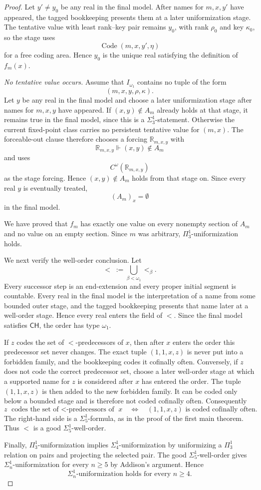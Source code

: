 \documentclass[10pt,a4paper]{amsart}
\newcommand{\CH}{\mathsf{CH}}
\newcommand{\forceR}{\mathbb{R}}
\begin{document}
\begin{proof}
Let $y'\neq y_0$ be any real in the final model. After names for $m,x,y'$ have appeared, the tagged bookkeeping presents them at a later uniformization stage. The tentative value with least rank--key pair remains $y_0$, with rank $\rho_0$ and key $\kappa_0$, so the stage uses
\[
\operatorname{Code}(m,x,y',\eta)
\]
for a free coding area. Hence $y_0$ is the unique real satisfying the definition of $f_m(x)$.

\medskip
\noindent
\emph{No tentative value occurs.}
Assume that $I_{\omega_1}$ contains no tuple of the form
\[
(m,x,y,\rho,\kappa).
\]
Let $y$ be any real in the final model and choose a later uniformization stage after names for $m,x,y$ have appeared. If $(x,y)\notin A_m$ already holds at that stage, it remains true in the final model, since this is a $\Sigma^1_3$-statement. Otherwise the current fixed-point class carries no persistent tentative value for $(m,x)$. The forceable-out clause therefore chooses a forcing $\forceR_{m,x,y}$ with
\[
\forceR_{m,x,y}\Vdash(x,y)\notin A_m
\]
and uses
\[
C^\omega(\forceR_{m,x,y})
\]
as the stage forcing. Hence $(x,y)\notin A_m$ holds from that stage on. Since every real $y$ is eventually treated,
\[
(A_m)_x=\emptyset
\]
in the final model.

We have proved that $f_m$ has exactly one value on every nonempty section of $A_m$ and no value on an empty section. Since $m$ was arbitrary, $\Pi^1_3$-uniformization holds.

We next verify the well-order conclusion. Let
\[
<\;:=\bigcup_{\beta<\omega_1}<_\beta.
\]
Every successor step is an end-extension and every proper initial segment is countable. Every real in the final model is the interpretation of a name from some bounded outer stage, and the tagged bookkeeping presents that name later at a well-order stage. Hence every real enters the field of $<$. Since the final model satisfies $\CH$, the order has type $\omega_1$.

If $z$ codes the set of $<$-predecessors of $x$, then after $x$ enters the order this predecessor set never changes. The exact tuple $(1,1,x,z)$ is never put into a forbidden family, and the bookkeeping codes it cofinally often. Conversely, if $z$ does not code the correct predecessor set, choose a later well-order stage at which a supported name for $z$ is considered after $x$ has entered the order. The tuple $(1,1,x,z)$ is then added to the new forbidden family. It can be coded only below a bounded stage and is therefore not coded cofinally often. Consequently
\[
z\text{ codes the set of $<$-predecessors of }x
\quad\Longleftrightarrow\quad
(1,1,x,z)\text{ is coded cofinally often}.
\]
The right-hand side is a $\Sigma^1_5$-formula, as in the proof of the first main theorem. Thus $<$ is a good $\Sigma^1_5$-well-order.

Finally, $\Pi^1_3$-uniformization implies $\Sigma^1_4$-uniformization by uniformizing a $\Pi^1_3$ relation on pairs and projecting the selected pair. The good $\Sigma^1_5$-well-order gives $\Sigma^1_n$-uniformization for every $n\geq5$ by Addison's argument. Hence
\[
\Sigma^1_n\text{-uniformization holds for every }n\geq4.
\]
\end{proof}
\end{document}
